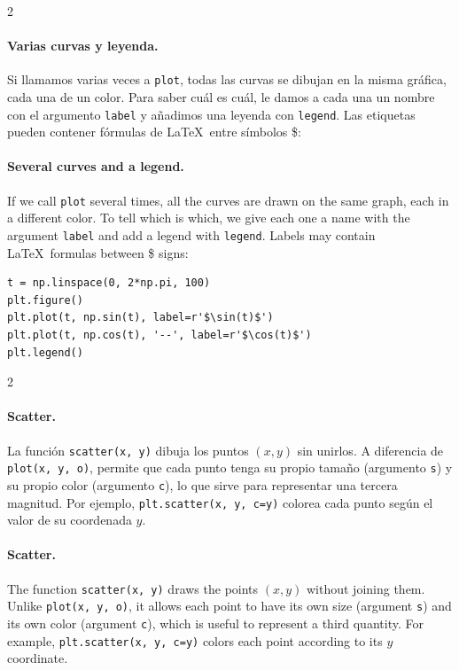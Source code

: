 \begin{paracol}{2}
\paragraph{Varias curvas y leyenda.} Si llamamos varias veces a \texttt{plot}, todas las curvas se dibujan en la misma gráfica, cada una de un color. Para saber cuál es cuál, le damos a cada una un nombre con el argumento \texttt{label} y añadimos una leyenda con \texttt{legend}. Las etiquetas pueden contener fórmulas de \LaTeX\ entre símbolos \$:
\switchcolumn
\paragraph{Several curves and a legend.} If we call \texttt{plot} several times, all the curves are drawn on the same graph, each in a different color. To tell which is which, we give each one a name with the argument \texttt{label} and add a legend with \texttt{legend}. Labels may contain \LaTeX\ formulas between \$ signs:
\end{paracol}
\begin{verbatim}
t = np.linspace(0, 2*np.pi, 100)
plt.figure()
plt.plot(t, np.sin(t), label=r'$\sin(t)$')
plt.plot(t, np.cos(t), '--', label=r'$\cos(t)$')
plt.legend()
\end{verbatim}

\begin{paracol}{2}
\paragraph{Scatter.} La función \texttt{scatter(x, y)} dibuja los puntos $(x,y)$ sin unirlos. A diferencia de \texttt{plot(x, y, \textquotesingle{}o\textquotesingle{})}, permite que cada punto tenga su propio tamaño (argumento \texttt{s}) y su propio color (argumento \texttt{c}), lo que sirve para representar una tercera magnitud. Por ejemplo, \texttt{plt.scatter(x, y, c=y)} colorea cada punto según el valor de su coordenada $y$.
\switchcolumn
\paragraph{Scatter.} The function \texttt{scatter(x, y)} draws the points $(x,y)$ without joining them. Unlike \texttt{plot(x, y, \textquotesingle{}o\textquotesingle{})}, it allows each point to have its own size (argument \texttt{s}) and its own color (argument \texttt{c}), which is useful to represent a third quantity. For example, \texttt{plt.scatter(x, y, c=y)} colors each point according to its $y$ coordinate.
\end{paracol}

